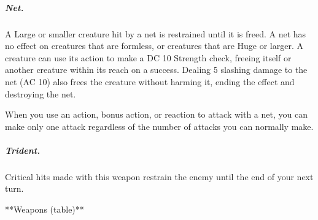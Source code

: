 \subparagraph*{Net.} A Large or smaller creature hit by a net is restrained until it is freed. A net has no effect on creatures that are formless, or creatures that are Huge or larger. A creature can use its action to make a DC 10 Strength check, freeing itself or another creature within its reach on a success. Dealing 5 slashing damage to the net (AC 10) also frees the creature without harming it, ending the effect and destroying the net.

When you use an action, bonus action, or reaction to attack with a net, you can make only one attack regardless of the number of attacks you can normally make.

\subparagraph*{Trident.} Critical hits made with this weapon restrain the enemy until the end of your next turn.

**Weapons (table)**

